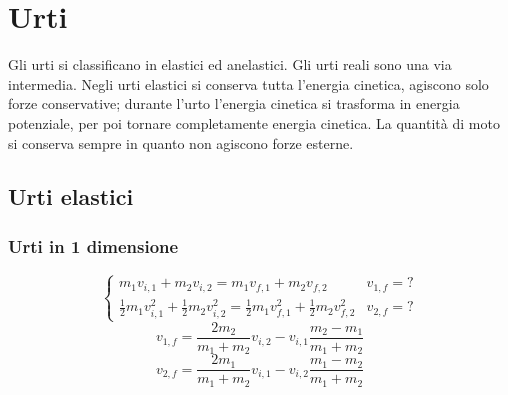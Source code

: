 \section{Urti}
Gli urti si classificano in elastici ed anelastici. Gli urti reali sono una via intermedia. Negli urti elastici si conserva tutta l'energia cinetica, agiscono solo forze conservative; durante l'urto l'energia cinetica si trasforma in energia potenziale, per poi tornare completamente energia cinetica. La quantità di moto si conserva sempre in quanto non agiscono forze esterne.

\subsection{Urti elastici}

\subsubsection{Urti in 1 dimensione}

$$ \left \{
\begin{array}{ll}
   m_1v_{i,1}+m_2v_{i,2}=m_1v_{f,1}+m_2v_{f,2} & v_{1,f}=? \\
   \frac{1}{2}m_1v_{i,1}^2+\frac{1}{2}m_2v_{i,2}^2=\frac{1}{2}m_1v_{f,1}^2+\frac{1}{2}m_2v_{f,2}^2 & v_{2,f}=?
   \end{array}
   \right.$$
\begin{equation*}v_{1,f}=\frac{2m_2}{m_1+m_2}v_{i,2}-v_{i,1}\frac{m_2-m_1}{m_1+m_2}\end{equation*}
\begin{equation*}v_{2,f}=\frac{2m_1}{m_1+m_2}v_{i,1}-v_{i,2}\frac{m_1-m_2}{m_1+m_2}\end{equation*}

